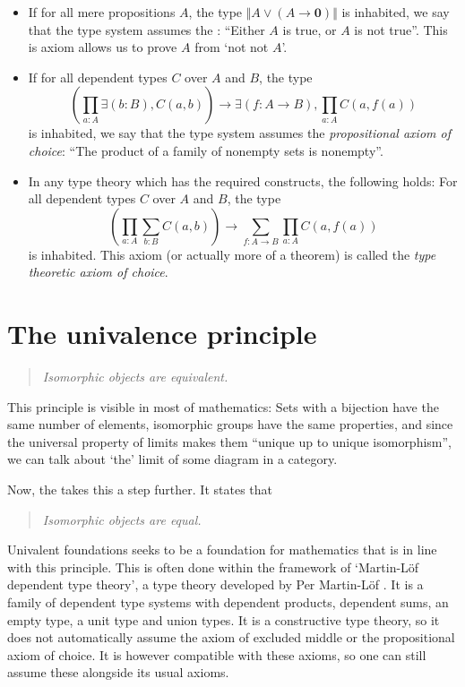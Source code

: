 \begin{itemize}
  \item If for all mere propositions $ A $, the type $ \Vert A \lor (A \to \mathbf 0) \Vert $ is inhabited, we say that the type system assumes the : ``Either $ A $ is true, or $ A $ is not true''. This is axiom allows us to prove $ A $ from `not not $ A $'.
  \item If for all dependent types $ C $ over $ A $ and $ B $, the type
    \[ \left(\prod_{a: A} \exists (b: B), C(a, b) \right) \to \exists (f: A \to B), \prod_{a: A} C(a, f(a)) \]
    is inhabited, we say that the type system assumes the \textit{propositional axiom of choice}: ``The product of a family of nonempty sets is nonempty''.
  \item In any type theory which has the required constructs, the following holds: For all dependent types $ C $ over $ A $ and $ B $, the type
    \[ \left(\prod_{a: A} \sum_{b: B} C(a, b) \right) \to \sum_{f: A \to B} \prod_{a: A} C(a, f(a)) \]
    is inhabited. This axiom (or actually more of a theorem) is called the \textit{type theoretic axiom of choice}.
\end{itemize}

\section{The univalence principle}
\begin{quote}
  \textit{Isomorphic objects are equivalent.}
\end{quote}
This principle is visible in most of mathematics: Sets with a bijection have the same number of elements, isomorphic groups have the same properties, and since the universal property of limits makes them ``unique up to unique isomorphism'', we can talk about `the' limit of some diagram in a category.

Now, the  takes this a step further. It states that
\begin{quote}
  \textit{Isomorphic objects are equal.}
\end{quote}
Univalent foundations seeks to be a foundation for mathematics that is in line with this principle. This is often done within the framework of `Martin-Löf dependent type theory', a type theory developed by Per Martin-Löf \cite{martin-lof-type-theory}. It is a family of dependent type systems with dependent products, dependent sums, an empty type, a unit type and union types. It is a constructive type theory, so it does not automatically assume the axiom of excluded middle or the propositional axiom of choice. It is however compatible with these axioms, so one can still assume these alongside its usual axioms.

